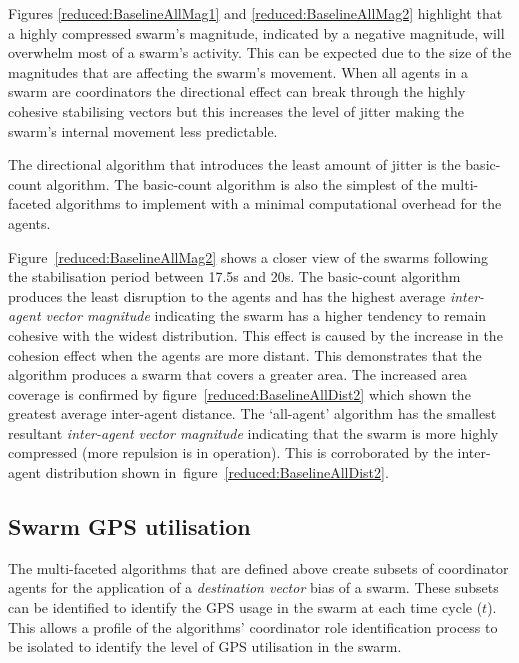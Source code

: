 Figures \ref{reduced:BaselineAllMag1} and \ref{reduced:BaselineAllMag2} highlight that a highly compressed swarm's magnitude, indicated by a negative magnitude, will overwhelm most of a swarm's activity. This can be expected due to the size of the magnitudes that are affecting the swarm's movement. When all agents in a swarm are coordinators the directional effect can break through the highly cohesive stabilising vectors but this increases the level of jitter making the swarm's internal movement less predictable.

The directional algorithm that introduces the least amount of jitter is the basic-count algorithm. The basic-count algorithm is also the simplest of the multi-faceted algorithms to implement with a minimal computational overhead for the agents. 

Figure~\ref{reduced:BaselineAllMag2} shows a closer view of the swarms following the stabilisation period between 17.5s and 20s. The basic-count algorithm produces the least disruption to the agents and has the highest average \textit{inter-agent vector magnitude} indicating the swarm has a higher tendency to remain cohesive with the widest distribution. This effect is caused by the increase in the cohesion effect when the agents are more distant. This demonstrates that the algorithm produces a swarm that covers a greater area. The increased area coverage is confirmed by figure~\ref{reduced:BaselineAllDist2} which shown the greatest average inter-agent distance. The `all-agent' algorithm has the smallest resultant \textit{inter-agent vector magnitude} indicating that the swarm is more highly compressed (more repulsion is in operation). This is corroborated by the inter-agent distribution shown in~figure~\ref{reduced:BaselineAllDist2}.

\subsection{Swarm GPS utilisation\label{section:compareGPSUages1}}
The multi-faceted algorithms that are defined above create subsets of coordinator agents for the application of a \textit{destination vector} bias of a swarm. These subsets can be identified to identify the GPS usage in the swarm at each time cycle ($t$). This allows a profile of the algorithms' coordinator role identification process to be isolated to identify the level of GPS utilisation in the swarm.

